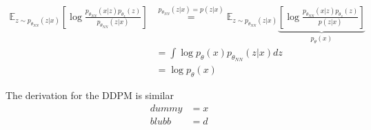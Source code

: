 \begin{align}
    \mathbb{E}_{z\sim p_{\theta_{NN}}(z|x)}\left[\log \frac{p_{\theta_{NN}}(x|z)p_{\theta_z}(z)}{p_{\theta_{NN}}(z|x)}\right] & \stackrel{p_{\theta_{NN}}(z|x) = p(z|x)}{=} \mathbb{E}_{z\sim p_{\theta_{NN}}(z|x)}\underbrace{\left[\log \frac{p_{\theta_{NN}}(x|z)p_{\theta_z}(z)}{p(z|x)}\right]}_{p_{\theta}(x)} \\
                                                                                                                              & = \int \log p_{\theta}(x) p_{\theta_{NN}}(z|x) dz                                                                                                                                    \\
                                                                                                                              & = \log p_{\theta}(x)
\end{align}

The derivation for the DDPM is similar
\begin{align}
    dummy & = x \\
    blubb & = d
\end{align}
